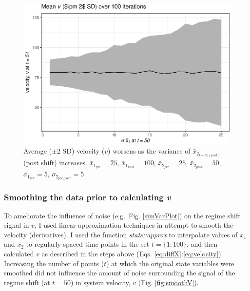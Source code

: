 \documentclass[12pt,twoside,openany]{reedthesis}
\begin{document}
\begin{figure}
\centering
\includegraphics{_myDissertation_files/figure-latex/simVarPlot2-1.pdf}
\caption{\label{fig:simVarPlot2}Average (\(\pm 2\) SD) velocity (\(v\))
worsens as the variance of \(\bar{x}_{2_{t=50 (post)}}\) (post shift)
increases. \(\bar{x}_{1_{pre}} = 25\), \(\bar{x}_{1_{post}} = 100\),
\(\bar{x}_{2_{pre}} = 25\), \(\bar{x}_{2_{post}} = 50\),
\(\sigma_{1_{pre}} = 5\), \(\sigma_{2_{pre,post}} = 5\)}
\end{figure}
\subsubsection{\texorpdfstring{Smoothing the data prior to calculating
\emph{v}}{Smoothing the data prior to calculating v}}\label{smoothing-the-data-prior-to-calculating-v}

To ameliorate the influence of noise (e.g.~Fig. \ref{simVarPlot}) on the
regime shift signal in \(v\), I used linear approximation techniques in
attempt to smooth the velocity (derivatives). I used the function
\emph{stats::approx} to interpolate values of \(x_1\) and \(x_2\) to
regularly-spaced time points in the set \(t=\{1:100\}\), and then
calculated \(v\) as described in the steps above (Eqs.
\eqref{eq:diffX}:\eqref{eq:velocity}). Increasing the number of points
(\(t\)) at which the original state variables were smoothed did not
influence the amount of noise surrounding the signal of the regime shift
(at \(t=50\)) in system velocity, \(v\) (Fig. \ref{fig:smoothV}).
\end{document}
